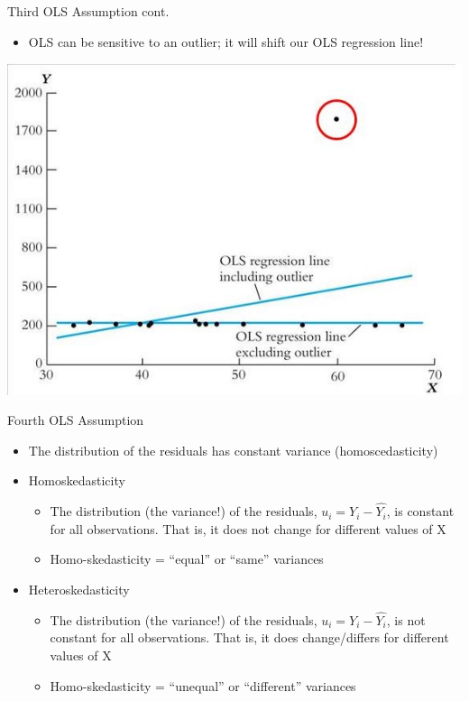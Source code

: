 \documentclass[8pt,ignorenonframetext,dvipsnames]{beamer}
\providecommand{\tightlist}{%
  \setlength{\itemsep}{0pt}\setlength{\parskip}{0pt}}
\let\olditem\item
\renewcommand{\item}{%
  \olditem\vspace{4pt}
}
\begin{document}
\begin{frame}{Third OLS Assumption cont.}
\protect\hypertarget{third-ols-assumption-cont.}{}

\begin{itemize}
\tightlist
\item
  OLS can be sensitive to an outlier; it will shift our OLS regression
  line!
\end{itemize}

\includegraphics{outliers.jpg}

\end{frame}

\begin{frame}{Fourth OLS Assumption}
\protect\hypertarget{fourth-ols-assumption}{}

\begin{itemize}
\tightlist
\item
  The distribution of the residuals has constant variance
  (homoscedasticity)
\item
  Homoskedasticity

  \begin{itemize}
  \tightlist
  \item
    The distribution (the variance!) of the residuals,
    \(u_i = Y_i - \hat{Y_i}\), is constant for all observations. That
    is, it does not change for different values of X
  \item
    Homo-skedasticity = ``equal'' or ``same'' variances
  \end{itemize}
\item
  Heteroskedasticity

  \begin{itemize}
  \tightlist
  \item
    The distribution (the variance!) of the residuals,
    \(u_i = Y_i - \hat{Y_i}\), is not constant for all observations.
    That is, it does change/differs for different values of X
  \item
    Homo-skedasticity = ``unequal'' or ``different'' variances
  \end{itemize}
\end{itemize}

\end{frame}
\end{document}
